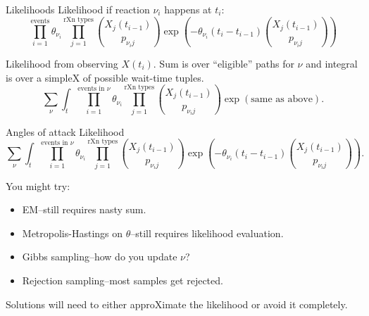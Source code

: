 \documentclass[12pt,a4paper,t,xcolor=dvipsnames,slidestop,compress,mathserif]{beamer}
\begin{document}
\begin{frame}{Likelihoods}
Likelihood if reaction $\nu_i$ happens at $t_i$: $$
\prod_{i=1}^\text{events} \theta_{\nu_{i}} \prod_{j=1}^\text{rXn types} {{X_{j}(t_{i-1})}\choose{p_{{\nu_{i}}j}}}\exp\left(-\theta_{\nu_{i}}
(t_i - t_{i-1}) {{X_j(t_{i-1})}\choose{p_{{\nu_{i}}j}}} \right)
$$

Likelihood from observing $X(t_i)$. Sum is over ``eligible'' paths for $\nu$ and integral is over a simpleX of possible wait-time tuples.
$$
\sum_{\nu}\int_{t} \prod_{i=1}^\text{events in $\nu$} \theta_{\nu_{i}} \prod_{j=1}^\text{rXn types} {{X_{j}(t_{i-1})}\choose{p_{{\nu_{i}}j}}}\exp\left(\text{same as above}\right).
$$

\end{frame}

\begin{frame}{Angles of attack}
Likelihood
$$
\sum_{\nu}\int_{t} \prod_{i=1}^\text{events in $\nu$} \theta_{\nu_{i}} \prod_{j=1}^\text{rXn types} {{X_{j}(t_{i-1})}\choose{p_{{\nu_{i}}j}}}\exp\left(-\theta_{\nu_{i}}
(t_i - t_{i-1}) {{X_j(t_{i-1})}\choose{p_{{\nu_{i}}j}}} \right).
$$

You might try:
\begin{itemize}
\item EM--still requires nasty sum.
\item Metropolis-Hastings on $\theta$--still requires likelihood evaluation.
\item Gibbs sampling--how do you update $\nu$?
\item Rejection sampling--most samples get rejected.
\end{itemize}

Solutions will need to either approXimate the likelihood or avoid it completely.

\end{frame}
\end{document}
